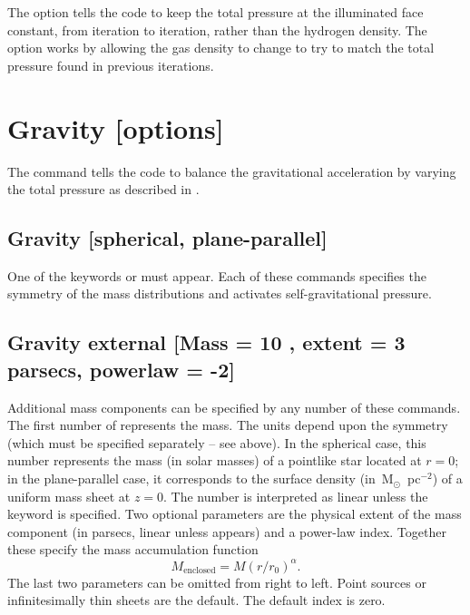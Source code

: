 The  option tells the code to keep the total pressure
at the illuminated face constant, from iteration to iteration,
rather than the hydrogen density.
The  option works by allowing the gas density
to change to try to match the total pressure 
found in previous iterations.

\section{Gravity [options] }

The  command tells the code to balance the gravitational 
acceleration by varying the total pressure as described in 
\citealp{AscasibarDiaz2009}.

\subsection{Gravity [spherical, plane-parallel] }

One of the keywords  or  
must appear.  Each of these commands specifies the symmetry of the mass distributions
and activates self-gravitational pressure.

\subsection{Gravity external [Mass = 10 {\Msun}, extent = 3 parsecs, powerlaw = -2]}

Additional mass components can be specified by any number of 
these commands.
The first number of represents the mass.  
The units depend upon the symmetry
(which must be specified separately -- see above).
In the spherical case, this number represents the mass (in solar masses) 
of a pointlike star located at $r=0$; in the plane-parallel case, 
it corresponds to the surface density (in~M$_\odot$~pc$^{-2}$) of a uniform
mass sheet at $z=0$.
The number is interpreted as linear 
unless the keyword  is specified.
Two optional parameters are the physical
extent of the mass component (in parsecs, linear unless  appears)
and a power-law index.  Together these specify the mass accumulation function
\begin{equation}
M_{\mathrm{enclosed}} = M (r/r_0)^\alpha.
\end{equation}
The last two parameters can be omitted from right to left.  
Point sources or infinitesimally thin sheets are the default.
The default index is zero.

